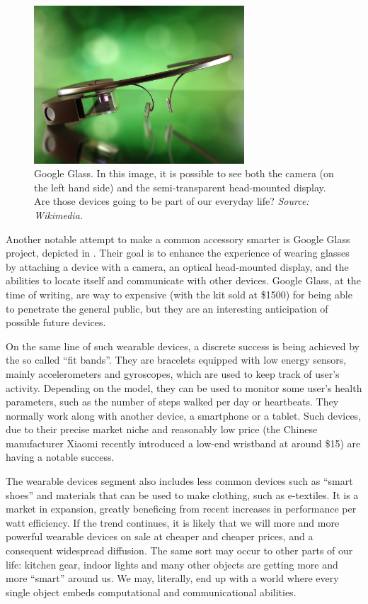 \documentclass[12pt,a4paper,twoside,openright]{book}
\begin{document}
\begin{figure}
	\centering
	\includegraphics[width=0.7\textwidth]{img/gglass}
	\caption[Google Glass]{Google Glass. In this image, it is possible to see both the camera (on the left hand side) and the semi-transparent head-mounted display. Are those devices going to be part of our everyday life? \emph{Source: Wikimedia.}}
	\label{img:gglass}
\end{figure}

Another notable attempt to make a common accessory smarter is Google Glass project, depicted in .
%
Their goal is to enhance the experience of wearing glasses by attaching a device with a camera, an optical head-mounted display, and the abilities to locate itself and communicate with other devices.
%
Google Glass, at the time of writing, are way to expensive (with the kit sold at \$1500) for being able to penetrate the general public, but they are an interesting anticipation of possible future devices.

On the same line of such wearable devices, a discrete success is being achieved by the so called ``fit bands''.
%
They are bracelets equipped with low energy sensors, mainly accelerometers and gyroscopes, which are used to keep track of user's activity.
%
Depending on the model, they can be used to monitor some user's health parameters, such as the number of steps walked per day or heartbeats.
%
They normally work along with another device, a smartphone or a tablet.
%
Such devices, due to their precise market niche and reasonably low price (the Chinese manufacturer Xiaomi recently introduced a low-end wristband at around \$15) are having a notable success.

The wearable devices segment also includes less common devices such as ``smart shoes'' and materials that can be used to make clothing, such as e-textiles.
%
It is a market in expansion, greatly beneficing from recent increases in performance per watt efficiency.
%
If the trend continues, it is likely that we will more and more powerful wearable devices on sale at cheaper and cheaper prices, and a consequent widespread diffusion.
%
The same sort may occur to other parts of our life: kitchen gear, indoor lights and many other objects are getting more and more ``smart'' around us.
%
We may, literally, end up with a world where every single object embeds computational and communicational abilities.
\end{document}
